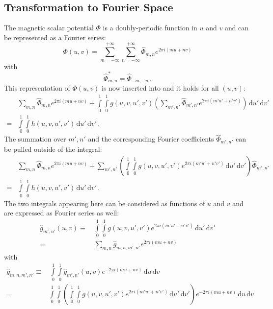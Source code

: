 \subsection{Transformation to Fourier Space}
The magnetic scalar potential $\Phi$ is a doubly-periodic function in $u$ and $v$ and can be represented as a Fourier series:
\begin{equation}
    \Phi(u,v)
  = \sum\limits_{m=-\infty}^{+\infty} \sum\limits_{n=-\infty}^{+\infty}
    \hat{\Phi}_{m,n} e^{2 \pi i (m u + n v)} \label{eqn:fourierPhi}
\end{equation}
with
\begin{equation}
 \hat{\Phi}^*_{m,n}=\hat{\Phi}_{-m,-n} \, .
\end{equation}
This representation of $\Phi(u,v)$ is now inserted into 
and it holds for all $(u,v)$:
\begin{align}
  ~& \sum\limits_{m,n}
    \hat{\Phi}_{m,n} e^{2 \pi i (m u + n v)}
  + \int\limits_0^1 \int\limits_0^1
      g(u,v,u',v')
      \left(\sum\limits_{m',n'} \hat{\Phi}_{m',n'} e^{2 \pi i (m' u' + n' v')} \right)
      \,\mathrm{d}u' \,\mathrm{d}v' \nonumber \\
  =& \int\limits_0^1 \int\limits_0^1
      h(u,v,u',v')
      \,\mathrm{d}u' \,\mathrm{d}v' \, .
\end{align}
The summation over $m', n'$ and the corresponding Fourier coefficients $\hat{\Phi}_{m',n'}$ can be pulled outside of the integral:
\begin{align}
  ~& \sum\limits_{m,n}
    \hat{\Phi}_{m,n} e^{2 \pi i (m u + n v)}
  + \sum\limits_{m',n'}
    \left(
      \int\limits_0^1 \int\limits_0^1
        g(u,v,u',v') e^{2 \pi i (m' u' + n' v')}
      \,\mathrm{d}u' \,\mathrm{d}v' \right)
    \hat{\Phi}_{m',n'} \nonumber \\
 =& \int\limits_0^1 \int\limits_0^1
      h(u,v,u',v')
      \,\mathrm{d}u' \,\mathrm{d}v' \, . \label{eqn:laplace_only_Phi_Fourier}
\end{align}
The two integrals appearing here can be considered as functions of $u$ and $v$
and are expressed as Fourier series as well:
\begin{align}
  \hat{g}_{m',n'}(u, v)
  \equiv&\, \int\limits_0^1 \int\limits_0^1
         g(u,v,u',v') e^{2 \pi i (m' u' + n' v')}
         \,\mathrm{d}u' \,\mathrm{d}v' \nonumber \\
  =&\, \sum\limits_{m,n} \hat{g}_{m,n,m',n'} e^{2 \pi i (m u + n v)} \label{eqn:fourier_g}
\end{align}
with
\begin{align}
     \hat{g}_{m,n,m',n'}
  \equiv&\, \int\limits_0^1 \int\limits_0^1
         \hat{g}_{m',n'}(u, v)
         e^{-2 \pi i(m u + n v)}
       \,\mathrm{d}u \,\mathrm{d}v \nonumber \\
  =& \int\limits_0^1 \int\limits_0^1
       \left(
         \int\limits_0^1 \int\limits_0^1
           g(u,v,u',v') e^{2 \pi i (m' u' + n' v')}
           \,\mathrm{d}u' \,\mathrm{d}v'
       \right)
       e^{-2 \pi i(m u + n v)}
       \,\mathrm{d}u \,\mathrm{d}v
\end{align}
